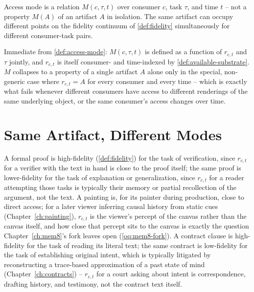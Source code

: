 \begin{proposition}
\label{prop:mode-relation}
Access mode is a relation $M(c, \tau, t)$ over consumer $c$, task $\tau$,
and time $t$ -- not a property $M(A)$ of an artifact $A$ in isolation.
The same artifact can occupy different points on the fidelity continuum
of \cref{def:fidelity} simultaneously for different consumer-task pairs.
\end{proposition}

\begin{proofsketch}
Immediate from \cref{def:access-mode}: $M(c,\tau,t)$ is defined as a
function of $r_{c,t}$ and $\tau$ jointly, and $r_{c,t}$ is itself
consumer- and time-indexed by \cref{def:available-substrate}. $M$
collapses to a property of a single artifact $A$ alone only in the
special, non-generic case where $r_{c,t} = A$ for every consumer and
every time -- which is exactly what fails whenever different consumers
have access to different renderings of the same underlying object, or
the same consumer's access changes over time.
\end{proofsketch}

\section{Same Artifact, Different Modes}

A formal proof is high-fidelity (\cref{def:fidelity}) for the task of
verification, since $r_{c,t}$ for a verifier with the text in hand is
close to the proof itself; the same proof is lower-fidelity for the task
of explanation or generalization, since $r_{c,t}$ for a reader attempting
those tasks is typically their memory or partial recollection of the
argument, not the text. A painting is, for its painter during production,
close to direct access; for a later viewer inferring causal history from
static cues (Chapter~\ref{ch:painting}), $r_{c,t}$ is the viewer's
percept of the canvas rather than the canvas itself, and how close that
percept sits to the canvas is exactly the question
Chapter~\ref{ch:mem8}'s fork leaves open (\cref{oq:mem8-fork}). A contract
clause is high-fidelity for the task of reading its literal text; the
same contract is low-fidelity for the task of establishing original
intent, which is typically litigated by reconstructing a trace-based
approximation of a past state of mind (Chapter~\ref{ch:contracts}) --
$r_{c,t}$ for a court asking about intent is correspondence, drafting
history, and testimony, not the contract text itself.

